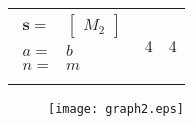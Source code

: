 {\quad{}

\begin{subequations}\label{eq: chap }
\begin{align}
\begin{split}

\end{split}
\end{align}
\end{subequations}



\begin{equation}\label{eq: chap }
\begin{split}

\end{split}
\end{equation}



\begin{align}\label{eq: chap }
\begin{split}

\end{split}
\end{align}



\begin{table}
\centering
\begin{tabular}{lll}
$\begin{aligned}
\mathbf{s}=&\begin{bmatrix}M_2\end{bmatrix}   \\
a=&b\\
n=&m\\
\end{aligned}$& 4 & 4\\
\end{tabular}
\caption{} \label{tab: chap }
\end{table}

\begin{figure}
    \centering
    \texttt{[image: graph2.eps]}
    \caption{}
    \label{}
\end{figure}


\begin{figure}
    \subfloat[]{\label{}
    \begin{minipage}[b]{1.0\textwidth}
    \centering
    \texttt{[image: ]}
    \end{minipage}}\\
    \subfloat[]{\label{}
    \begin{minipage}[b]{1.0\textwidth}
    \centering
    \texttt{[image: ]}
    \end{minipage}}
    \caption{}
    \label{}
\end{figure}

}
